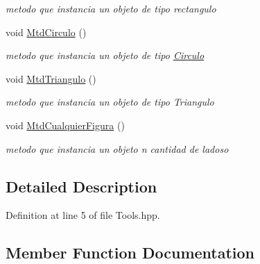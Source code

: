 \begin{DoxyCompactItemize}
\begin{DoxyCompactList}\small\item\em metodo que instancia un objeto de tipo rectangulo \end{DoxyCompactList}\item 
\mbox{\label{class_principal_a8711ee7dd8bb46d4014a6d27275ea104}} 
void \hyperlink{class_principal_a8711ee7dd8bb46d4014a6d27275ea104}{Mtd\+Circulo} ()
\begin{DoxyCompactList}\small\item\em metodo que instancia un objeto de tipo \hyperlink{class_circulo}{Circulo} \end{DoxyCompactList}\item 
\mbox{\label{class_principal_afc5a6c41795be6c9c29e4be5c4188322}} 
void \hyperlink{class_principal_afc5a6c41795be6c9c29e4be5c4188322}{Mtd\+Triangulo} ()
\begin{DoxyCompactList}\small\item\em metodo que instancia un objeto de tipo Triangulo \end{DoxyCompactList}\item 
\mbox{\label{class_principal_a3eda271bf0f7f3cc694dd0d6b7a6bc0d}} 
void \hyperlink{class_principal_a3eda271bf0f7f3cc694dd0d6b7a6bc0d}{Mtd\+Cualquier\+Figura} ()
\begin{DoxyCompactList}\small\item\em metodo que instancia un objeto n cantidad de ladoso \end{DoxyCompactList}\end{DoxyCompactItemize}


\subsection{Detailed Description}


Definition at line 5 of file Tools.\+hpp.



\subsection{Member Function Documentation}
\mbox{\label{class_principal_aca941b071da80e6d5202010165950101}} 
